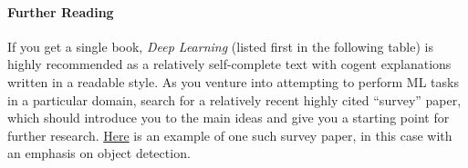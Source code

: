 \documentclass[
]{article}
\begin{document}
\hypertarget{further-reading}{%
\paragraph{Further Reading}\label{further-reading}}

If you get a single book, \emph{Deep Learning} (listed first in the
following table) is highly recommended as a relatively self-complete
text with cogent explanations written in a readable style. As you
venture into attempting to perform ML tasks in a particular domain,
search for a relatively recent highly cited ``survey'' paper, which
should introduce you to the main ideas and give you a starting point for
further research. \href{https://arxiv.org/pdf/1907.09408.pdf}{Here} is
an example of one such survey paper, in this case with an emphasis on
object detection.
\end{document}
